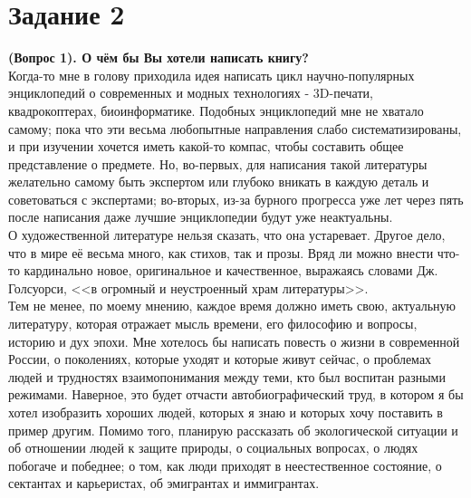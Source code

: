 \documentclass[a4paper,12pt]{article} %
\begin{document}
\section{Задание 2}
\textbf{(Вопрос 1). О чём бы Вы хотели написать книгу?} \\
Когда-то мне в голову приходила идея написать цикл научно-популярных энциклопедий о современных и модных технологиях - 3D-печати, квадрокоптерах, биоинформатике. Подобных энциклопедий мне не хватало самому; пока что эти весьма любопытные направления слабо систематизированы, и при изучении хочется иметь какой-то компас, чтобы составить общее представление о предмете. Но, во-первых, для написания такой литературы желательно самому быть экспертом или глубоко вникать в каждую деталь и советоваться с экспертами; во-вторых, из-за бурного прогресса уже лет через пять после написания даже лучшие энциклопедии будут уже неактуальны.\\
О художественной литературе нельзя сказать, что она устаревает. Другое дело, что в мире её весьма много, как стихов, так и прозы. Вряд ли можно внести что-то кардинально новое, оригинальное и качественное, выражаясь словами Дж. Голсуорси, <<в огромный и неустроенный храм литературы>>.\\
Тем не менее, по моему мнению, каждое время должно иметь свою, актуальную литературу, которая отражает мысль времени, его философию и вопросы, историю и дух эпохи.  Мне хотелось бы написать повесть о жизни в современной России, о поколениях, которые уходят и которые живут сейчас, о проблемах людей и трудностях взаимопонимания между теми, кто был воспитан разными режимами. Наверное, это будет отчасти автобиографический труд, в котором я бы хотел изобразить хороших людей, которых я знаю и которых хочу поставить в пример другим. Помимо того, планирую рассказать об экологической ситуации и об отношении людей к защите природы, о социальных вопросах, о людях побогаче и победнее; о том, как люди приходят в неестественное состояние, о сектантах и карьеристах, об эмигрантах и иммигрантах.\\
\end{document}
